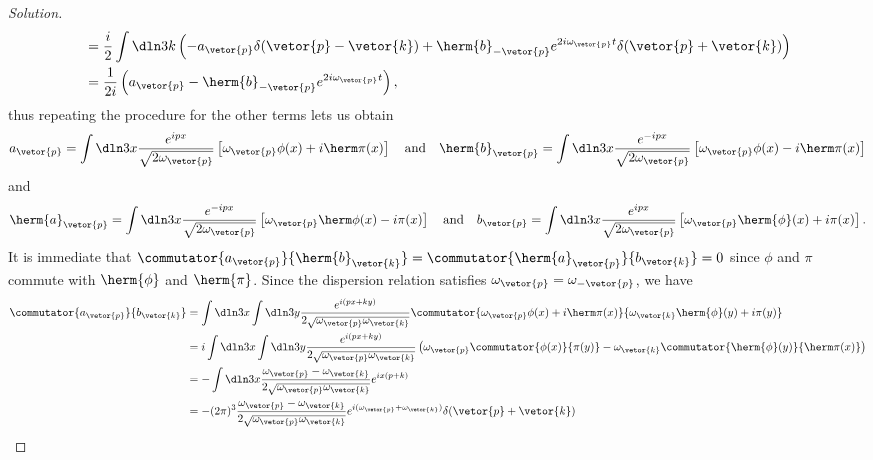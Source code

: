 \begin{proof}[Solution]
\begin{align*}
                                                     &= \frac{i}2\int \dln3k \left(-a_{\vetor{p}} \delta(\vetor{p} - \vetor{k}) + \herm{b}_{-\vetor{p}} e^{2i \omega_{\vetor{p}}t}\delta(\vetor{p} + \vetor{k})\right)\\
                                                     &= \frac{1}{2i} \left(a_{\vetor{p}} - \herm{b}_{-\vetor{p}}e^{2i \omega_{\vetor{p}}t} \right),
   \end{align*}
   thus repeating the procedure for the other terms lets us obtain
   \begin{equation*}
      a_{\vetor{p}} = \int\dln3x \frac{e^{ipx}}{\sqrt{2\omega_{\vetor{p}}}} \left[\omega_{\vetor{p}} \phi(x) + i \herm\pi(x)\right]
      \quad\text{and}\quad
      \herm{b}_{\vetor{p}} = \int\dln3x \frac{e^{-ipx}}{\sqrt{2\omega_{\vetor{p}}}} \left[\omega_{\vetor{p}} \phi(x) - i \herm\pi(x)\right]
   \end{equation*}
   and
   \begin{equation*}
      \herm{a}_{\vetor{p}} = \int\dln3x \frac{e^{-ipx}}{\sqrt{2\omega_{\vetor{p}}}} \left[\omega_{\vetor{p}} \herm\phi(x) - i \pi(x)\right]
      \quad\text{and}\quad
      b_{\vetor{p}} = \int\dln3x \frac{e^{ipx}}{\sqrt{2\omega_{\vetor{p}}}} \left[\omega_{\vetor{p}} \herm{\phi}(x) + i {\pi}(x)\right].
   \end{equation*}
   It is immediate that \(\commutator{a_{\vetor{p}}}{\herm{b}_{\vetor{k}}} = \commutator{\herm{a}_{\vetor{p}}}{b_{\vetor{k}}} = 0\) since \(\phi\) and \(\pi\) commute with \(\herm{\phi}\) and \(\herm{\pi}\). Since the dispersion relation satisfies \(\omega_{\vetor{p}} = \omega_{-\vetor{p}}\), we have
   \begin{align*}
      \commutator{a_{\vetor{p}}}{b_{\vetor{k}}} &= \int \dln3{x} \int \dln3{y} \frac{e^{i(px + k y)}}{2\sqrt{\omega_{\vetor{p}}\omega_{\vetor{k}}}} \commutator{\omega_{\vetor{p}} \phi(x) + i \herm\pi(x)}{\omega_{\vetor{k}} \herm{\phi}(y) + i \pi(y)}\\
                                                &= i\int \dln3x \int \dln3{y} \frac{e^{i(px + k y)}}{2 \sqrt{\omega_{\vetor{p}} \omega_{\vetor{k}}}} \left(\omega_{\vetor{p}}\commutator{\phi(x)}{\pi(y)} - \omega_{\vetor{k}} \commutator{\herm{\phi}(y)}{\herm\pi(x)} \right)\\
                                                &= - \int \dln3x \frac{\omega_{\vetor{p}} - \omega_{\vetor{k}}}{2 \sqrt{\omega_{\vetor{p}} \omega_{\vetor{k}}}} e^{ix(p + k)}\\
                                                &= -(2\pi)^3 \frac{\omega_{\vetor{p}} - \omega_{\vetor{k}}}{2\sqrt{\omega_{\vetor{p}} \omega_{\vetor{k}}}} e^{i(\omega_{\vetor{p}} + \omega_{\vetor{k}})} \delta(\vetor{p} + \vetor{k})\\

\end{align*}
\end{proof}
